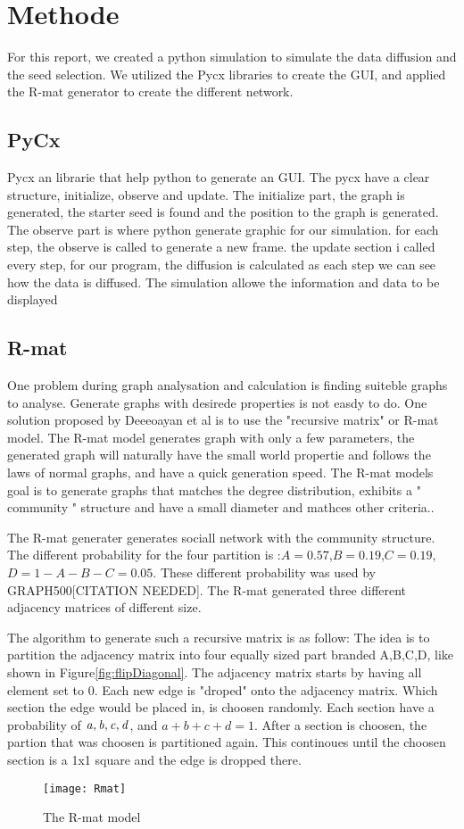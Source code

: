 \chapter{Methode}
For this report, we created a python simulation to simulate the data diffusion and the seed selection. We utilized the Pycx libraries to create the GUI, and applied the R-mat generator to create the different network.

\section{PyCx}
Pycx an librarie that help python to generate an GUI\cite{Pycx}. The pycx have a clear structure, initialize, observe and update. The initialize part, the graph is generated, the starter seed is found and the position to the graph is generated. The observe part is where python generate graphic for our simulation. for each step, the observe is called to generate a new frame. the update section i called every step, for our program, the diffusion is calculated as each step we can see how the data is diffused. The simulation allowe the information and data to be displayed 


\section{R-mat}
One problem during graph analysation and calculation is finding suiteble graphs to analyse. Generate graphs with desirede properties is not easdy to do. One solution proposed by Deeeoayan et al is to use the "recursive matrix" or R-mat model. The R-mat model generates graph with only a few parameters, the generated graph will naturally have the small world propertie and follows the laws of normal graphs, and have a quick generation speed\cite{Rmat2004}. The R-mat models goal is to generate graphs that matches the degree distribution, exhibits a " community " structure and have a small diameter and mathces other criteria.\cite{Rmat2004}.

The R-mat generater generates sociall network with the community structure. The different probability for the four partition is :$A=0.57$,$B=0.19$,$C=0.19$,$D = 1-A-B-C = 0.05$. These different probability was used by GRAPH500[CITATION NEEDED]. The R-mat generated three different adjacency matrices of different size.


The algorithm to generate such a recursive matrix is as follow: The idea is to partition the adjacency matrix into four equally sized part branded A,B,C,D, like shown in Figure\ref{fig:flipDiagonal}. The adjacency matrix starts by having all element set to 0. Each new edge is "droped" onto the adjacency matrix. Which section the edge would be placed in, is choosen randomly. Each section have a probability of $\it{a, b, c, d}$, and $a + b + c + d = 1$. After a section is choosen, the partion that was choosen is partitioned again. This continoues until the choosen section is a 1x1 square and the edge is dropped there. 
\begin{figure}
\texttt{[image: Rmat]}
\caption{The R-mat model}
\label{fig:Rmat}
\end{figure}


